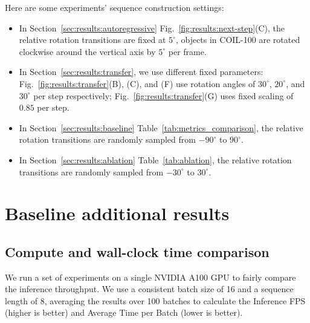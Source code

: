 Here are some experiments' sequence construction settings:
\begin{itemize}

\item In Section~\ref{sec:results:autoregressive} Fig.~\ref{fig:results:next-step}(C), the relative rotation transitions are fixed at $5^{\circ}$, objects in COIL-100 are rotated clockwise around the vertical axis by $5^{\circ}$ per frame. 

\item In Section~\ref{sec:results:transfer}, we use different fixed parameters: Fig.~\ref{fig:results:transfer}(B), (C), and (F) use rotation angles of $30^{\circ}$, $20^{\circ}$, and $30^{\circ}$ per step respectively; Fig.~\ref{fig:results:transfer}(G) uses fixed scaling of $0.85$ per step.

\item In Section~\ref{sec:results:baseline} Table~\ref{tab:metrics_comparison}, the relative rotation transitions are randomly sampled from $-90^{\circ}$ to $90^{\circ}$.

\item In Section~\ref{sec:results:ablation} Table~\ref{tab:ablation}, the relative rotation transitions are randomly sampled from $-30^{\circ}$ to $30^{\circ}$.
\end{itemize}

\newpage
\section{Baseline additional results}
\subsection{Compute and wall-clock time comparison}
\begin{table}[!htbp]
\vspace{-0.2cm}
\centering
\caption{Quantitative comparison of Inference FPS and Average time per batch across different models.}
\vspace{-0.2 cm}
\end{table}
We run a set of experiments on a single NVIDIA A100 GPU to fairly compare the inference throughput. We use a consistent batch size of 16 and a sequence length of 8, averaging the results over 100 batches to calculate the Inference FPS (higher is better) and Average Time per Batch (lower is better).


